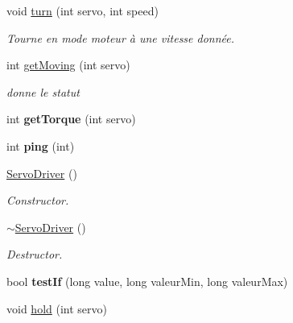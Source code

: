 \begin{DoxyCompactItemize}
\mbox{\label{classServoDriver_ad68ebde8a710451c8fea2cd03cfa4bc0}} 
void \hyperlink{classServoDriver_ad68ebde8a710451c8fea2cd03cfa4bc0}{turn} (int servo, int speed)
\begin{DoxyCompactList}\small\item\em Tourne en mode moteur à une vitesse donnée. \end{DoxyCompactList}\item 
int \hyperlink{classServoDriver_a0a8e84f0bbcff39549ddfc239f1a6237}{get\+Moving} (int servo)
\begin{DoxyCompactList}\small\item\em donne le statut \end{DoxyCompactList}\item 
\mbox{\label{classServoDriver_a108cce4f0dcf60bf443ee932621bc89c}} 
int {\bfseries get\+Torque} (int servo)
\item 
\mbox{\label{classServoDriver_afc853f7f2f46acb7e4721f4ce4314522}} 
int {\bfseries ping} (int)
\item 
\mbox{\label{classServoDriver_a2076bae148e26ee3f854f1f1984d9714}} 
\hyperlink{classServoDriver_a2076bae148e26ee3f854f1f1984d9714}{Servo\+Driver} ()
\begin{DoxyCompactList}\small\item\em Constructor. \end{DoxyCompactList}\item 
\mbox{\label{classServoDriver_acf6cad7d5b891fbe4ff44eaec8409db7}} 
\hyperlink{classServoDriver_acf6cad7d5b891fbe4ff44eaec8409db7}{$\sim$\+Servo\+Driver} ()
\begin{DoxyCompactList}\small\item\em Destructor. \end{DoxyCompactList}\item 
\mbox{\label{classServoDriver_a1717fa8a917f761fa8a859636609052c}} 
bool {\bfseries test\+If} (long value, long valeur\+Min, long valeur\+Max)
\item 
\mbox{\label{classServoDriver_af580283b3d1765c9a27276e9a870cf88}} 
void \hyperlink{classServoDriver_af580283b3d1765c9a27276e9a870cf88}{hold} (int servo)

\end{DoxyCompactItemize}
